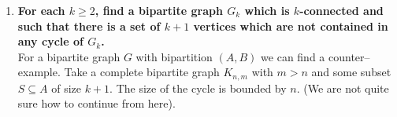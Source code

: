 \begin{enumerate}[label=\textbf{(\alph*)}]
    \boldmath
    \item \textbf{For each $k \geq 2$, find a bipartite graph $G_k$ which is $k$-connected and such that there is a set of $k + 1$ vertices which are not contained in any cycle of $G_k$.} \\
    \linebreak
    \unboldmath
    For a bipartite graph $G$ with bipartition $(A,B)$ we can find a counter–example. Take a complete bipartite
    graph $K_{n,m}$ with $m > n$ and some subset $S \subseteq A$ of size $k+1$.  The size of the cycle is bounded by $n$. (We are not quite sure how to continue from here). 
\end{enumerate}